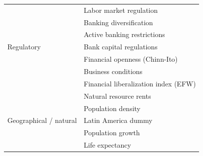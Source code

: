 \documentclass[a4paper,11pt]{article}
\begin{document}
\begin{table}[ht!]
\begin{tabular}{ll}
		\midrule
		\multirow{7}{*}{Regulatory}  & Labor market regulation \\
		& Banking diversification \\
		& Active banking restrictions \\
		& Bank capital regulations \\
		& Financial openness (Chinn-Ito) \\
		& Business conditions \\
		& Financial liberalization index (EFW) \\
		
		\midrule
		\multirow{5}{*}{Geographical / natural} & Natural resource rents \\
		& Population density \\
		& Latin America dummy \\
		& Population growth \\
		& Life expectancy \\
		\bottomrule
	\end{tabular}
\end{table}
\clearpage
\end{document}
